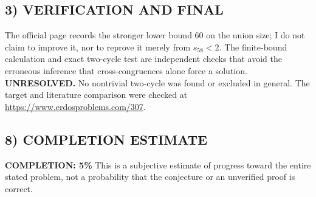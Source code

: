 \subsection*{3) VERIFICATION AND FINAL}
The official page records the stronger lower bound 60 on the union size;
I do not claim to improve it, nor to reprove it merely from $s_{58}<2$.
The finite-bound calculation and exact two-cycle test are independent
checks that avoid the erroneous inference that cross-congruences alone
force a solution. \textbf{UNRESOLVED.} No nontrivial two-cycle was found
or excluded in general. The target and literature comparison were checked
at \url{https://www.erdosproblems.com/307}.

\subsection*{8) COMPLETION ESTIMATE}
\textbf{COMPLETION: 5\%}
This is a subjective estimate of progress toward the entire stated problem, not a probability that the conjecture or an unverified proof is correct.
